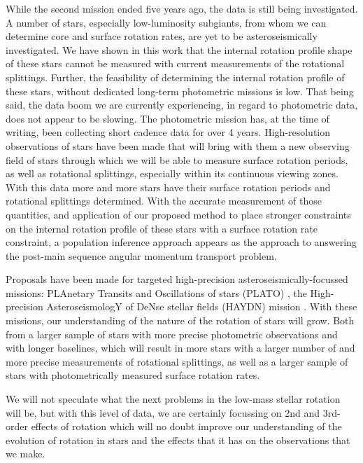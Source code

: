 While the second \kepler{} mission ended five years ago, the data is still being investigated.
A number of stars, especially low-luminosity subgiants, from whom we can determine core and surface rotation rates, are yet to be asteroseismically investigated.
We have shown in this work that the internal rotation profile shape of these stars cannot be measured with current measurements of the rotational splittings.
Further, the feasibility of determining the internal rotation profile of these stars, without dedicated long-term photometric missions is low.
That being said, the data boom we are currently experiencing, in regard to photometric data, does not appear to be slowing.
The \TESS{} photometric mission has, at the time of writing, been collecting short cadence data for over 4 years.
High-resolution observations of stars have been made that will bring with them a new observing field of stars through which we will be able to measure surface rotation periods, as well as rotational splittings, especially within its continuous viewing zones.
With this data more and more stars have their surface rotation periods \citep{claytor__2023} and rotational splittings determined.
With the accurate measurement of those quantities, and application of our proposed method to place stronger constraints on the internal rotation profile of these stars with a surface rotation rate constraint, a population inference approach appears as the approach to answering the post-main sequence angular momentum transport problem.

Proposals have been made for targeted high-precision asteroseismically-focussed missions: PLAnetary Transits and Oscillations of stars (PLATO) \citep{}, the High-precision AsteroseismologY of DeNse stellar fields (HAYDN) mission \citep{}.
With these missions, our understanding of the nature of the rotation of stars will grow.
Both from a larger sample of stars with more precise photometric observations and with longer baselines, which will result in more stars with a larger number of and more precise measurements of rotational splittings, as well as a larger sample of stars with photometrically measured surface rotation rates.

We will not speculate what the next problems in the low-mass stellar rotation will be, but with this level of data, we are certainly focussing on 2nd and 3rd-order effects of rotation which will no doubt improve our understanding of the evolution of rotation in stars and the effects that it has on the observations that we make.




